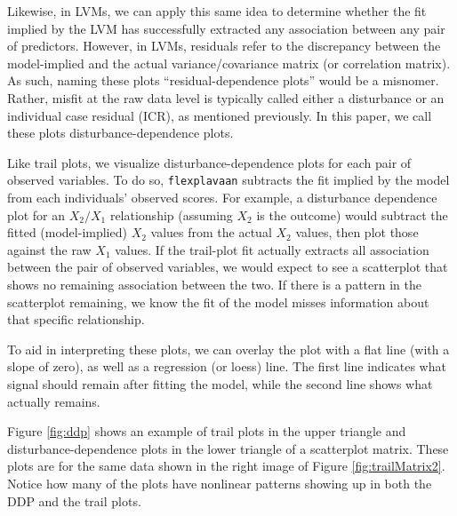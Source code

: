 \documentclass[
  english,
  man]{apa6}
\begin{document}
Likewise, in LVMs, we can apply this same idea to determine whether the fit implied by the LVM has successfully extracted any association between any pair of predictors. However, in LVMs, residuals refer to the discrepancy between the model-implied and the actual variance/covariance matrix (or correlation matrix). As such, naming these plots ``residual-dependence plots'' would be a misnomer. Rather, misfit at the raw data level is typically called either a disturbance or an individual case residual (ICR), as mentioned previously. In this paper, we call these plots disturbance-dependence plots.

Like trail plots, we visualize disturbance-dependence plots for each pair of observed variables. To do so, \texttt{flexplavaan} subtracts the fit implied by the model from each individuals' observed scores. For example, a disturbance dependence plot for an \(X_2/X_1\) relationship (assuming \(X_2\) is the outcome) would subtract the fitted (model-implied) \(X_2\) values from the actual \(X_2\) values, then plot those against the raw \(X_1\) values. If the trail-plot fit actually extracts all association between the pair of observed variables, we would expect to see a scatterplot that shows no remaining association between the two. If there is a pattern in the scatterplot remaining, we know the fit of the model misses information about that specific relationship.

To aid in interpreting these plots, we can overlay the plot with a flat line (with a slope of zero), as well as a regression (or loess) line. The first line indicates what signal should remain after fitting the model, while the second line shows what actually remains.

Figure \ref{fig:ddp} shows an example of trail plots in the upper triangle and disturbance-dependence plots in the lower triangle of a scatterplot matrix. These plots are for the same data shown in the right image of Figure \ref{fig:trailMatrix2}. Notice how many of the plots have nonlinear patterns showing up in both the DDP and the trail plots.
\end{document}
